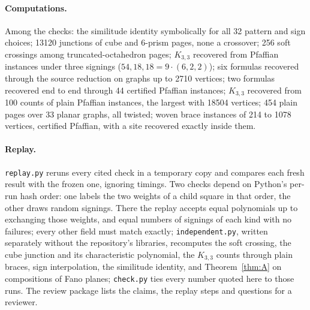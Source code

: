 \documentclass[11pt]{article}
\theoremstyle{definition}
\theoremstyle{remark}
\begin{document}
\paragraph{Computations.} Among the checks: the similitude identity
symbolically for all 32 pattern and sign choices; 13120 junctions of cube and
6-prism pages, none a crossover; 256 soft crossings among truncated-octahedron
pages; $K_{3,3}$ recovered from Pfaffian instances under three signings
($54,18,18=9\cdot(6,2,2)$); six formulas recovered through the source
reduction on graphs up to 2710 vertices; two formulas recovered end to end
through 44 certified Pfaffian instances; $K_{3,3}$ recovered from 100 counts of
plain Pfaffian instances, the largest with 18504 vertices; 454 plain pages
over 33 planar graphs, all twisted; woven brace instances of 214 to 1078
vertices, certified Pfaffian, with a site recovered exactly inside them.

\paragraph{Replay.} \texttt{replay.py} reruns every cited check in a
temporary copy and compares each fresh result with the frozen one, ignoring
timings. Two checks depend on Python's per-run hash order: one labels the two
weights of a child square in that order, the other draws random signings.
There the replay accepts equal polynomials up to exchanging those weights, and
equal numbers of signings of each kind with no failures; every other field
must match exactly; \texttt{independent.py}, written separately without the repository's
libraries, recomputes the soft crossing, the cube junction and its
characteristic polynomial, the $K_{3,3}$ counts through plain braces, sign
interpolation, the similitude identity, and Theorem~\ref{thm:A} on
compositions of Fano planes; \texttt{check.py} ties every number quoted here to
those runs. The review package lists the claims, the replay steps and
questions for a reviewer.
\end{document}
